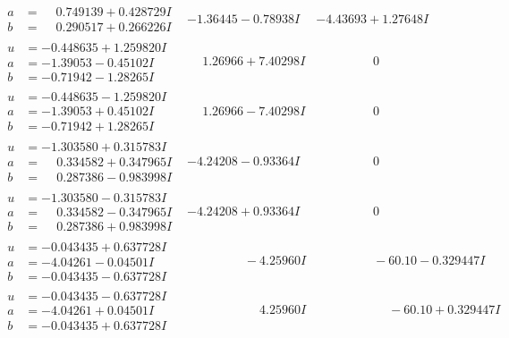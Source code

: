 \documentclass[1p]{elsarticle_modified}
\theoremstyle{definition}
\begin{document}
$$\begin{array}{c|c|c}
\begin{aligned}
a &= \phantom{-}0.749139 + 0.428729 I \\
b &= \phantom{-}0.290517 + 0.266226 I\end{aligned}
 & -1.36445 - 0.78938 I & -4.43693 + 1.27648 I \\ \hline\begin{aligned}
u &= -0.448635 + 1.259820 I \\
a &= -1.39053 - 0.45102 I \\
b &= -0.71942 - 1.28265 I\end{aligned}
 & \phantom{-}1.26966 + 7.40298 I & \phantom{-0.000000 } 0 \\ \hline\begin{aligned}
u &= -0.448635 - 1.259820 I \\
a &= -1.39053 + 0.45102 I \\
b &= -0.71942 + 1.28265 I\end{aligned}
 & \phantom{-}1.26966 - 7.40298 I & \phantom{-0.000000 } 0 \\ \hline\begin{aligned}
u &= -1.303580 + 0.315783 I \\
a &= \phantom{-}0.334582 + 0.347965 I \\
b &= \phantom{-}0.287386 - 0.983998 I\end{aligned}
 & -4.24208 - 0.93364 I & \phantom{-0.000000 } 0 \\ \hline\begin{aligned}
u &= -1.303580 - 0.315783 I \\
a &= \phantom{-}0.334582 - 0.347965 I \\
b &= \phantom{-}0.287386 + 0.983998 I\end{aligned}
 & -4.24208 + 0.93364 I & \phantom{-0.000000 } 0 \\ \hline\begin{aligned}
u &= -0.043435 + 0.637728 I \\
a &= -4.04261 - 0.04501 I \\
b &= -0.043435 - 0.637728 I\end{aligned}
 & \phantom{-0.000000 } -4.25960 I & \phantom{-0.000000 }      -6
0. 10   - 0.329447 I \\ \hline\begin{aligned}
u &= -0.043435 - 0.637728 I \\
a &= -4.04261 + 0.04501 I \\
b &= -0.043435 + 0.637728 I\end{aligned}
 & \phantom{-0.000000 -}4.25960 I & \phantom{-0.000000 -}     -6
0. 10   + 0.329447 I\\

\end{array}$$
\end{document}
